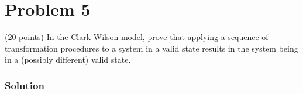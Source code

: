 \section*{Problem 5}
 (20 points) In the Clark-Wilson model, prove that applying a sequence of transformation procedures to a system in a valid state results in the system being in a (possibly different) valid state.

\subsubsection*{Solution}
